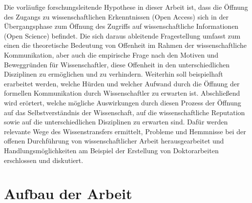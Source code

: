 Die vorläufige forschungsleitende Hypothese in dieser Arbeit ist, dass die Öffnung des Zugangs zu wissenschaftlichen Erkenntnissen (Open Access) sich in der Übergangsphase zum Öffnung des Zugriffs auf wissenschaftliche Informationen (Open Science) befindet. Die sich daraus ableitende Fragestellung umfasst zum einen die theoretische Bedeutung von Offenheit im Rahmen der wissenschaftliche Kommunikation, aber auch die empirische Frage nach den Motiven und Beweggründen für Wissenschaftler, diese Offenheit in den unterschiedlichen Disziplinen zu ermöglichen und zu verhindern. Weiterhin soll beispielhaft erarbeitet werden, welche Hürden und welcher Aufwand durch die Öffnung der formellen Kommunikation durch Wissenschaftler zu erwarten ist. Abschließend wird erörtert, welche mögliche Auswirkungen durch diesen Prozess der Öffnung auf das Selbstverständnis der Wissenschaft, auf die wissenschaftliche Reputation sowie auf die unterschiedlichen Disziplinen zu erwarten sind. Dafür werden relevante Wege des Wissenstransfers ermittelt, Probleme und Hemmnisse bei der offenen Durchführung von wissenschaftlicher Arbeit herausgearbeitet und Handlungsmöglichkeiten am Beispiel der Erstellung von Doktorarbeiten erschlossen und diskutiert.

\section{Aufbau der Arbeit}

